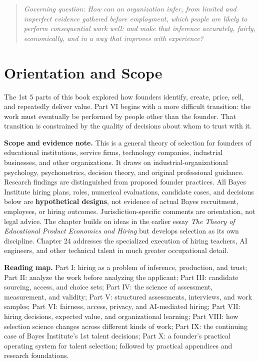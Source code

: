 
\begin{quote}
\textit{Governing question: How can an organization infer, from limited and imperfect evidence gathered before employment, which people are likely to perform consequential work well: and make that inference accurately, fairly, economically, and in a way that improves with experience?}
\end{quote}

\vspace{1.5pt}

\section*{Orientation and Scope}

The 1st 5 parts of this book explored how founders identify, create, price, sell, and repeatedly deliver value. Part VI begins with a more difficult transition: the work must eventually be performed by people other than the founder. That transition is constrained by the quality of decisions about whom to trust with it.

\textbf{Scope and evidence note.} This is a general theory of selection for founders of educational institutions, service firms, technology companies, industrial businesses, and other organizations. It draws on industrial-organizational psychology, psychometrics, decision theory, and original professional guidance. Research findings are distinguished from proposed founder practices. All Bayes Institute hiring plans, roles, numerical evaluations, candidate cases, and decisions below are \textbf{hypothetical designs}, not evidence of actual Bayes recruitment, employees, or hiring outcomes. Jurisdiction-specific comments are orientation, not legal advice. The chapter builds on ideas in the earlier essay \textit{The Theory of Educational Product Economics and Hiring} but develops selection as its own discipline. Chapter 24 addresses the specialized execution of hiring teachers, AI engineers, and other technical talent in much greater occupational detail.

\textbf{Reading map.} Part I: hiring as a problem of inference, production, and trust; Part II: analyze the work before analyzing the applicant; Part III: candidate sourcing, access, and choice sets; Part IV: the science of assessment, measurement, and validity; Part V: structured assessments, interviews, and work samples; Part VI: fairness, access, privacy, and AI-mediated hiring; Part VII: hiring decisions, expected value, and organizational learning; Part VIII: how selection science changes across different kinds of work; Part IX: the continuing case of Bayes Institute's 1st talent decisions; Part X: a founder's practical operating system for talent selection; followed by practical appendices and research foundations.

